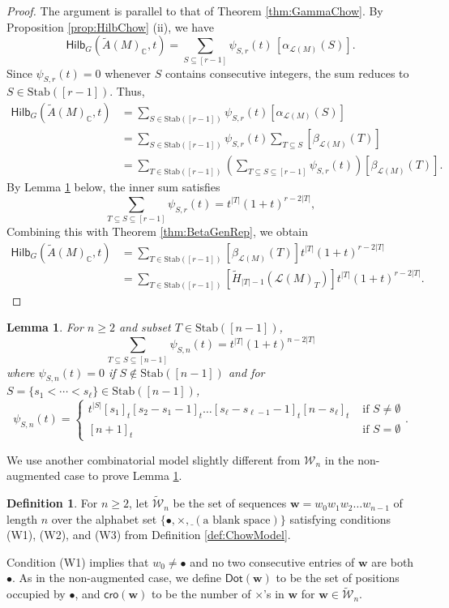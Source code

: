 \documentclass[reqno]{amsart}
\newcommand{\Stab}{{\mathrm{Stab}}}
\newcommand{\cro}{{\mathsf{cro}}}
\renewcommand{\Dot}{{\mathsf{Dot}}}
\renewcommand{\L}{{\mathcal{L}}}
\newcommand{\Hilb}{{\mathsf{Hilb}}}
\newtheorem{lem}[thm]{Lemma}
\theoremstyle{definition}
\newtheorem{defi}[thm]{Definition}
\theoremstyle{remark}
\begin{document}
\begin{proof}
The argument is parallel to that of Theorem \ref{thm:GammaChow}.
By Proposition \ref{prop:HilbChow} (ii), we have
\[
\Hilb_G(\widetilde{A}(M)_{\mathbb{C}},t)
=\sum_{S\subseteq [r-1]} \psi_{S,r}(t)\,[\alpha_{\L(M)}(S)].
\]
Since $\psi_{S,r}(t)=0$ whenever $S$ contains consecutive integers, the sum reduces to $S\in\Stab([r-1])$. Thus, 
\begin{align*}
    \Hilb_G(\widetilde{A}(M)_{\mathbb{C}},t)
    &=\sum_{S\in\Stab([r-1])}\psi_{S,r}(t)[\alpha_{\L(M)}(S)]\\
    &=\sum_{S\in\Stab([r-1])}\psi_{S,r}(t)\sum_{T\subseteq S}[\beta_{\L(M)}(T)]\\
    &=\sum_{T\in\Stab([r-1])}\left(\sum_{T\subseteq S\subseteq [r-1]}\psi_{S,r}(t)\right)[\beta_{\L(M)}(T)].
\end{align*}
By Lemma \ref{lem:AugIdentity} below, the inner sum satisfies
\[
    \sum_{T\subseteq S\subseteq [r-1]}\psi_{S,r}(t)=t^{|T|}(1+t)^{r-2|T|},
\] 
Combining this with Theorem \ref{thm:BetaGenRep}, we obtain
\begin{align*}
    \Hilb_G(\widetilde{A}(M)_{\mathbb{C}},t)
    &=\sum_{T\in\Stab([r-1])}[\beta_{\L(M)}(T)]t^{|T|}(1+t)^{r-2|T|}\\
    &=\sum_{T\in\Stab([r-1])}[\tilde{H}_{|T|-1}(\L(M)_T)]t^{|T|}(1+t)^{r-2|T|}.
\end{align*}
\end{proof}


\begin{lem} \label{lem:AugIdentity}
For $n\ge 2$ and subset $T\in\Stab([n-1])$, 
\begin{equation} \label{eq:AugIdentity}
    \sum_{T\subseteq S\subseteq [n-1]}\psi_{S,n}(t)=t^{|T|}(1+t)^{n-2|T|}
\end{equation}
where $\psi_{S,n}(t)=0$ if $S\notin\Stab([n-1])$ and for $S=\{s_1<\cdots<s_{\ell}\}\in\Stab([n-1])$,
\[
    \psi_{S,n}(t)=\begin{cases}
        t^{|S|}[s_1]_t[s_2-s_1-1]_t\ldots[s_{\ell}-s_{\ell-1}-1]_t[n-s_{\ell}]_t  & \text{ if }S\neq\emptyset\\
        [n+1]_t  & \text{ if }S=\emptyset
    \end{cases}.
\]
\end{lem}

We use another combinatorial model slightly different from $\mathcal{W}_n$ in the non-augmented case to prove Lemma \ref{lem:AugIdentity}. 

\begin{defi}
For $n\ge 2$, let $\widetilde{\mathcal{W}}_n$ be the set of sequences $\mathbf{w}=w_0w_1w_2\ldots w_{n-1}$ of length $n$ over the alphabet set $\{\bullet, \times, \underline{\phantom{~}} (\text{a blank space})\}$ satisfying conditions
(W1), (W2), and (W3) from Definition \ref{def:ChowModel}.
\end{defi}
Condition (W1) implies that $w_0\neq \bullet$ and no two consecutive entries of $\mathbf{w}$ are both $\bullet$. 
As in the non-augmented case, we define $\Dot(\mathbf{w})$ to be the set of positions occupied by $\bullet$, and $\cro(\mathbf{w})$ to be the number of $\times$’s in $\mathbf{w}$ for $\mathbf{w}\in\widetilde{\mathcal{W}}_n$.
 
\end{document}
